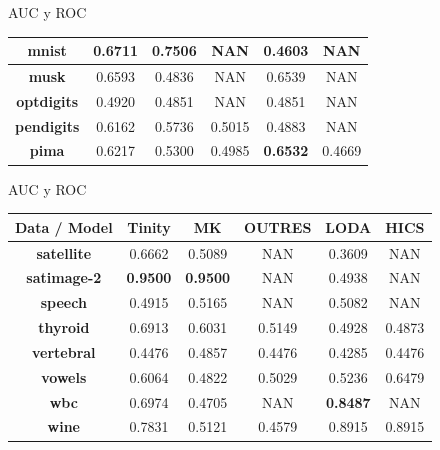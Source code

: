 \documentclass[10pt]{beamer}
\begin{document}
\begin{frame}[fragile]{AUC y ROC}
\begin{table}
\begin{tabular}{|c|c|c|c|c|c|}
		\hline
		\textbf{mnist}          & 0.6711           & \textbf{0.7506}  & NAN              & 0.4603           & NAN             \\ 
		\hline
		\textbf{musk}           & 0.6593           & 0.4836           & NAN              & 0.6539           & NAN             \\ 
		\hline
		\textbf{optdigits}      & 0.4920           & 0.4851           & NAN              & 0.4851           & NAN             \\ 
		\hline
		\textbf{pendigits}      & 0.6162           & 0.5736           & 0.5015           & 0.4883           & NAN             \\ 
		\hline
		\textbf{pima}           & 0.6217           & 0.5300           & 0.4985           & \textbf{0.6532}  & 0.4669          \\ 
		\hline
	\end{tabular}
\end{table}

\end{frame}

\begin{frame}[fragile]{AUC y ROC}
\vspace{10px}

\begin{table}
	\centering
	\begin{tabular}{|c|c|c|c|c|c|} 
		\hline
		\textbf{Data / Model}  & \textbf{Tinity}  & \textbf{MK}      & \textbf{OUTRES}  & \textbf{LODA}    & \textbf{HICS}   \\ 
		\hline
		\textbf{satellite}      & 0.6662           & 0.5089           & NAN              & 0.3609           & NAN             \\ 
		\hline
		\textbf{satimage-2}     & \textbf{0.9500}  & \textbf{0.9500}  & NAN              & 0.4938           & NAN             \\ 
		\hline
		\textbf{speech}         & 0.4915           & 0.5165           & NAN              & 0.5082           & NAN             \\ 
		\hline
		\textbf{thyroid}        & 0.6913           & 0.6031           & 0.5149           & 0.4928           & 0.4873          \\ 
		\hline
		\textbf{vertebral}      & 0.4476           & 0.4857           & 0.4476           & 0.4285           & 0.4476          \\ 
		\hline
		\textbf{vowels}         & 0.6064           & 0.4822           & 0.5029           & 0.5236           & 0.6479          \\ 
		\hline
		\textbf{wbc}            & 0.6974           & 0.4705           & NAN              & \textbf{0.8487}  & NAN             \\ 
		\hline
		\textbf{wine}           & 0.7831           & 0.5121           & 0.4579           & 0.8915           & 0.8915          \\
		\hline
	\end{tabular}
\end{table}

\end{frame}
\end{document}

